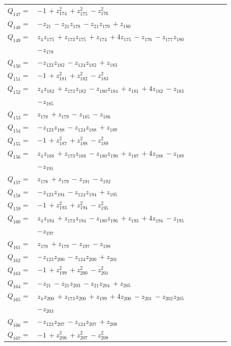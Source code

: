 \begin{longtable}{@{}r p{0.88\linewidth}@{}}
$Q_{147}=$ & $-1\,+z_{174}^{2}\,+z_{175}^{2}\,-z_{176}^{2}$\\[5pt]
$Q_{148}=$ & $-z_{21}\,-z_{21}z_{178}\,-z_{21}z_{179}\,+z_{180}$\\[5pt]
$Q_{149}=$ & $z_{4}z_{175}\,+z_{173}z_{175}\,+z_{174}\,+4z_{175}\,-z_{176}\,-z_{177}z_{180}$\\
 & $-z_{178}$\\[5pt]
$Q_{150}=$ & $-z_{123}z_{182}\,-z_{124}z_{182}\,+z_{183}$\\[5pt]
$Q_{151}=$ & $-1\,+z_{181}^{2}\,+z_{182}^{2}\,-z_{183}^{2}$\\[5pt]
$Q_{152}=$ & $z_{4}z_{182}\,+z_{173}z_{182}\,-z_{180}z_{184}\,+z_{181}\,+4z_{182}\,-z_{183}$\\
 & $-z_{185}$\\[5pt]
$Q_{153}=$ & $z_{178}\,+z_{179}\,-z_{185}\,-z_{186}$\\[5pt]
$Q_{154}=$ & $-z_{123}z_{188}\,-z_{124}z_{188}\,+z_{189}$\\[5pt]
$Q_{155}=$ & $-1\,+z_{187}^{2}\,+z_{188}^{2}\,-z_{189}^{2}$\\[5pt]
$Q_{156}=$ & $z_{4}z_{188}\,+z_{173}z_{188}\,-z_{180}z_{190}\,+z_{187}\,+4z_{188}\,-z_{189}$\\
 & $-z_{191}$\\[5pt]
$Q_{157}=$ & $z_{178}\,+z_{179}\,-z_{191}\,-z_{192}$\\[5pt]
$Q_{158}=$ & $-z_{123}z_{194}\,-z_{124}z_{194}\,+z_{195}$\\[5pt]
$Q_{159}=$ & $-1\,+z_{193}^{2}\,+z_{194}^{2}\,-z_{195}^{2}$\\[5pt]
$Q_{160}=$ & $z_{4}z_{194}\,+z_{173}z_{194}\,-z_{180}z_{196}\,+z_{193}\,+4z_{194}\,-z_{195}$\\
 & $-z_{197}$\\[5pt]
$Q_{161}=$ & $z_{178}\,+z_{179}\,-z_{197}\,-z_{198}$\\[5pt]
$Q_{162}=$ & $-z_{123}z_{200}\,-z_{124}z_{200}\,+z_{201}$\\[5pt]
$Q_{163}=$ & $-1\,+z_{199}^{2}\,+z_{200}^{2}\,-z_{201}^{2}$\\[5pt]
$Q_{164}=$ & $-z_{21}\,-z_{21}z_{203}\,-z_{21}z_{204}\,+z_{205}$\\[5pt]
$Q_{165}=$ & $z_{4}z_{200}\,+z_{173}z_{200}\,+z_{199}\,+4z_{200}\,-z_{201}\,-z_{202}z_{205}$\\
 & $-z_{203}$\\[5pt]
$Q_{166}=$ & $-z_{123}z_{207}\,-z_{124}z_{207}\,+z_{208}$\\[5pt]
$Q_{167}=$ & $-1\,+z_{206}^{2}\,+z_{207}^{2}\,-z_{208}^{2}$\\[5pt]

\end{longtable}
